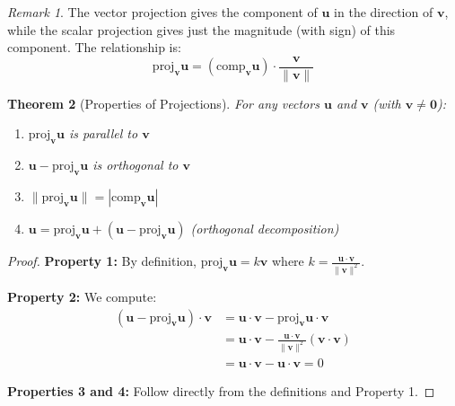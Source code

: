 \documentclass[12pt]{article}
\numberwithin{equation}{section}
\newcommand{\vect}[1]{\boldsymbol{#1}}   %
\theoremstyle{plain}
\newtheorem{theorem}{Theorem}[section]
\theoremstyle{definition}
\theoremstyle{remark}
\newtheorem{remark}[theorem]{Remark}
\begin{document}
\begin{remark}
The vector projection gives the component of $\vect{u}$ in the direction of $\vect{v}$, while the scalar projection gives just the magnitude (with sign) of this component. The relationship is:
$$\text{proj}_{\vect{v}}\vect{u} = \left(\text{comp}_{\vect{v}}\vect{u}\right) \cdot \frac{\vect{v}}{\|\vect{v}\|}$$
\end{remark}

\begin{theorem}[Properties of Projections]
For any vectors $\vect{u}$ and $\vect{v}$ (with $\vect{v} \neq \vect{0}$):
\begin{enumerate}
\item $\text{proj}_{\vect{v}}\vect{u}$ is parallel to $\vect{v}$
\item $\vect{u} - \text{proj}_{\vect{v}}\vect{u}$ is orthogonal to $\vect{v}$
\item $\|\text{proj}_{\vect{v}}\vect{u}\| = |\text{comp}_{\vect{v}}\vect{u}|$
\item $\vect{u} = \text{proj}_{\vect{v}}\vect{u} + (\vect{u} - \text{proj}_{\vect{v}}\vect{u})$ (orthogonal decomposition)
\end{enumerate}
\end{theorem}

\begin{proof}
\textbf{Property 1:} By definition, $\text{proj}_{\vect{v}}\vect{u} = k\vect{v}$ where $k = \frac{\vect{u} \cdot \vect{v}}{\|\vect{v}\|^2}$.

\textbf{Property 2:} We compute:
\begin{align}
(\vect{u} - \text{proj}_{\vect{v}}\vect{u}) \cdot \vect{v} &= \vect{u} \cdot \vect{v} - \text{proj}_{\vect{v}}\vect{u} \cdot \vect{v}\\
&= \vect{u} \cdot \vect{v} - \frac{\vect{u} \cdot \vect{v}}{\|\vect{v}\|^2}(\vect{v} \cdot \vect{v})\\
&= \vect{u} \cdot \vect{v} - \vect{u} \cdot \vect{v} = 0
\end{align}

\textbf{Properties 3 and 4:} Follow directly from the definitions and Property 1.
\end{proof}
\end{document}
